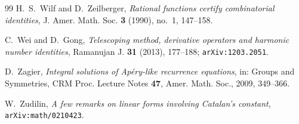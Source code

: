 \documentclass[11pt]{article}
\theoremstyle{definition}
\theoremstyle{remark}
\begin{document}
\begin{thebibliography}{99}
H.~S.~Wilf and D.~Zeilberger,
\emph{Rational functions certify combinatorial identities},
J. Amer. Math. Soc. \textbf{3} (1990), no.~1, 147--158.

C.~Wei and D.~Gong,
\emph{Telescoping method, derivative operators and harmonic number identities},
Ramanujan J. \textbf{31} (2013), 177--188; \texttt{arXiv:1203.2051}.

D.~Zagier,
\emph{Integral solutions of Ap\'ery-like recurrence equations},
in: Groups and Symmetries, CRM Proc. Lecture Notes \textbf{47},
Amer. Math. Soc., 2009, 349--366.

W.~Zudilin,
\emph{A few remarks on linear forms involving Catalan's constant},
\texttt{arXiv:math/0210423}.

\end{thebibliography}
\end{document}
